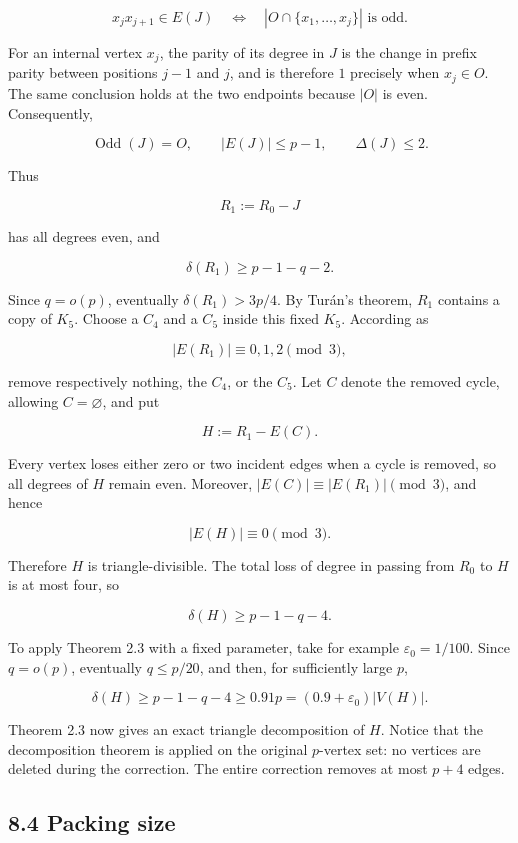 \documentclass[
  11pt,
]{article}
\begin{document}
\[
x_jx_{j+1}\in E(J)
\quad\Longleftrightarrow\quad
|O\cap\{x_1,\ldots,x_j\}|\text{ is odd}.
\tag{8.5}
\]

For an internal vertex \(x_j\), the parity of its degree in \(J\) is the
change in prefix parity between positions \(j-1\) and \(j\), and is
therefore \(1\) precisely when \(x_j\in O\). The same conclusion holds
at the two endpoints because \(|O|\) is even. Consequently,

\[
\operatorname{Odd}(J)=O,
\qquad
|E(J)|\le p-1,
\qquad
\Delta(J)\le2.
\tag{8.6}
\]

Thus

\[
R_1:=R_0-J
\]

has all degrees even, and

\[
\delta(R_1)\ge p-1-q-2.
\tag{8.7}
\]

Since \(q=o(p)\), eventually \(\delta(R_1)>3p/4\). By Turán's theorem,
\(R_1\) contains a copy of \(K_5\). Choose a \(C_4\) and a \(C_5\)
inside this fixed \(K_5\). According as

\[
|E(R_1)|\equiv0,1,2\pmod3,
\]

remove respectively nothing, the \(C_4\), or the \(C_5\). Let \(C\)
denote the removed cycle, allowing \(C=\varnothing\), and put

\[
H:=R_1-E(C).
\]

Every vertex loses either zero or two incident edges when a cycle is
removed, so all degrees of \(H\) remain even. Moreover,
\(|E(C)|\equiv |E(R_1)|\pmod3\), and hence

\[
|E(H)|\equiv0\pmod3.
\]

Therefore \(H\) is triangle-divisible. The total loss of degree in
passing from \(R_0\) to \(H\) is at most four, so

\[
\delta(H)\ge p-1-q-4.
\tag{8.8}
\]

To apply Theorem 2.3 with a fixed parameter, take for example
\(\varepsilon_0=1/100\). Since \(q=o(p)\), eventually \(q\le p/20\), and
then, for sufficiently large \(p\),

\[
\delta(H)\ge p-1-q-4\ge0.91p=(0.9+\varepsilon_0)|V(H)|.
\tag{8.9}
\]

Theorem 2.3 now gives an exact triangle decomposition of \(H\). Notice
that the decomposition theorem is applied on the original \(p\)-vertex
set: no vertices are deleted during the correction. The entire
correction removes at most \(p+4\) edges.

\subsection{8.4 Packing size}\label{packing-size}
\end{document}
